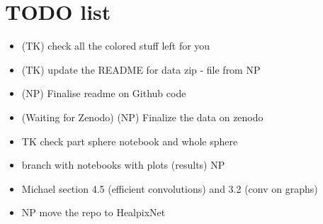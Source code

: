 \documentclass[final,twocolumn,3p,times,authoryear]{elsarticle}
\newcommand{\1}{\b{1}}              %
\newcommand{\0}{\b{0}}              %
\begin{document}
\section{TODO list}
\begin{itemize}[noitemsep,topsep=0pt,parsep=0pt,partopsep=0pt]
    \item (TK) check all the colored stuff left for you

    \item (TK) update the README for data zip - file from NP
    \item (NP) Finalise readme on Github code
    \item (Waiting for Zenodo) (NP) Finalize the data on zenodo
    \item TK check part sphere notebook and whole sphere
    \item branch with notebooks with plots (results) NP
    \item Michael section 4.5 (efficient convolutions) and 3.2 (conv on graphs)
    \item NP move the repo to HealpixNet



\end{itemize}
\end{document}
